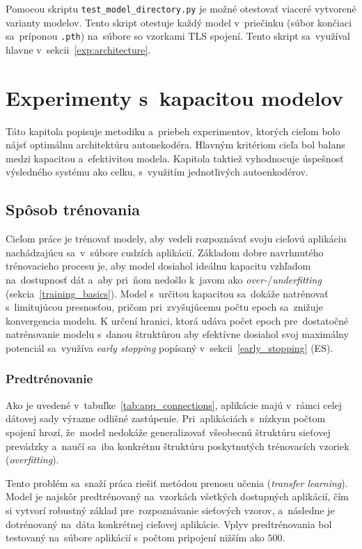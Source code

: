 Pomocou skriptu \texttt{test\_model\_directory.py} je možné otestovať viaceré vytvorené varianty modelov. Tento skript otestuje každý model v~priečinku (súbor končiaci sa~príponou \texttt{.pth}) na~súbore so vzorkami TLS spojení. Tento skript sa~využíval hlavne v~sekcii~\ref{exp:architecture}.

\chapter{Experimenty s~kapacitou modelov}\label{experiments}
Táto kapitola popisuje metodiku a~priebeh experimentov, ktorých cieľom bolo nájsť optimálnu architektúru autonekodéra. Hlavným kritériom cieľa bol balans medzi kapacitou a~efektivitou modela. Kapitola taktiež vyhodnocuje úspešnosť výsledného systému ako celku, s~využitím jednotlivých autoenkodérov.  

\section{Spôsob trénovania}
Cieľom práce je trénovať modely, aby vedeli rozpoznávať svoju cieľovú aplikáciu nachádzajúcu sa~v~súbore cudzích aplikácií. Základom dobre navrhnutého trénovacieho procesu je, aby model dosiahol ideálnu kapacitu vzhľadom na~dostupnosť dát a~aby pri~ňom nedošlo k~javom ako \textit{over-}/\textit{underfitting} (sekcia~\ref{training_basics}). Model s~určitou kapacitou sa~dokáže natrénovať s~limitujúcou presnosťou, pričom pri~zvyšujúcemu počtu epoch sa~znižuje konvergencia modelu. K určení hranici, ktorá udáva počet epoch pre~dostatočné natrénovanie modelu s~danou štruktúrou aby efektívne dosiahol svoj maximálny potenciál sa~využíva \textit{early stopping} popísaný v~sekcii~\ref{early_stopping} (ES).

\subsection{Predtrénovanie}\label{exp:pre-training}
Ako je uvedené v~tabuľke~\ref{tab:app_connections}, aplikácie majú v~rámci celej dátovej sady výrazne odlišné zastúpenie. Pri~aplikáciách s~nízkym počtom spojení hrozí, že~model nedokáže generalizovať všeobecnú štruktúru sieťovej prevádzky a~naučí sa~iba konkrétnu štruktúru poskytnutých trénovacích vzoriek (\textit{overfitting}). 

Tento problém sa~snaží práca riešiť metódou prenosu učenia (\textit{transfer learning}). Model je najskôr predtrénovaný na~vzorkách všetkých dostupných aplikácií, čím si vytvorí robustný základ pre~rozpoznávanie sieťových vzorov, a~následne je dotrénovaný na~dáta konkrétnej cieľovej aplikácie. Vplyv predtrénovania bol testovaný na~súbore aplikácií s~počtom pripojení nižším ako $500$. 

